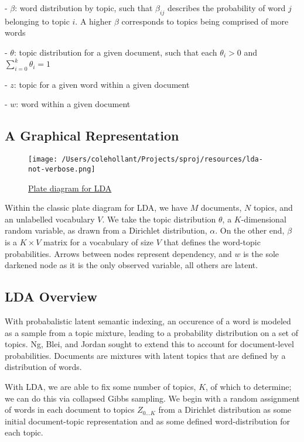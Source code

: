 \documentclass[11pt, twoside, reqno]{book}
\begin{document}
- $\beta$: word distribution by topic, such that $\beta_{ij}$ describes the probability of word $j$ belonging to topic $i$. A higher $\beta$ corresponds to topics being comprised of more words

- $\theta$: topic distribution for a given document, such that each $\theta_i > 0$  and $\sum_{i=0}^{k} \theta_i=1$

- $z$: topic for a given word within a given document

- $w$: word within a given document

\subsection{A Graphical Representation}

\begin{figure}[h!]
    \centering
    \texttt{[image: /Users/colehollant/Projects/sproj/resources/lda-not-verbose.png]}
    
    \href{https://upload.wikimedia.org/wikipedia/commons/thumb/d/d3/Latent_Dirichlet_allocation.svg/593px-Latent_Dirichlet_allocation.svg.png}{Plate diagram for LDA}
\end{figure}


Within the classic plate diagram for LDA, we have $M$ documents, $N$ topics, and an unlabelled vocabulary $V$. We take the topic distribution $\theta$, a $K$-dimensional random variable, as drawn from a Dirichlet distribution, $\alpha$. On the other end, $\beta$ is a $K \times V$ matrix for a vocabulary of size $V$ that defines the word-topic probabilities. Arrows between nodes represent dependency, and $w$ is the sole darkened node as it is the only observed variable, all others are latent.

\subsection{LDA Overview}

With probabalistic latent semantic indexing, an occurence of a word is modeled as a sample from a topic mixture, leading to a probability distribution on a set of topics. Ng, Blei, and Jordan sought to extend this to account for document-level probabilities. Documents are mixtures with latent topics that are defined by a distribution of words.

With LDA, we are able to fix some number of topics, $K$, of which to determine; we can do this via collapsed Gibbs sampling. We begin with a random assignment of words in each document to topics $Z_{0\dots K}$ from a Dirichlet distribution as some initial document-topic representation and as some defined word-distribution for each topic.
\end{document}
